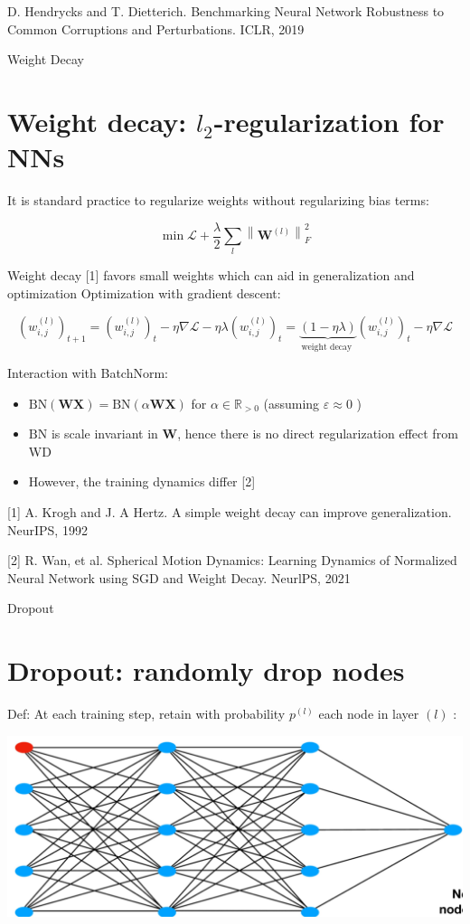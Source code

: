 \documentclass[10pt]{article}
\begin{document}
D. Hendrycks and T. Dietterich. Benchmarking Neural Network Robustness to Common Corruptions and Perturbations. ICLR, 2019

Weight Decay

\section*{Weight decay: $l_{2}$-regularization for NNs}
It is standard practice to regularize weights without regularizing bias terms:

$$
\min \mathscr{L}+\frac{\lambda}{2} \sum_{l}\left\|\mathbf{W}^{(l)}\right\|_{F}^{2}
$$

Weight decay [1] favors small weights which can aid in generalization and optimization Optimization with gradient descent:

$$
\left(w_{i, j}^{(l)}\right)_{t+1}=\left(w_{i, j}^{(l)}\right)_{t}-\eta \nabla \mathscr{L}-\eta \lambda\left(w_{i, j}^{(l)}\right)_{t}=\underbrace{(1-\eta \lambda)}_{\text {weight decay }}\left(w_{i, j}^{(l)}\right)_{t}-\eta \nabla \mathscr{L}
$$

Interaction with BatchNorm:

\begin{itemize}
  \item $\mathrm{BN}(\mathbf{W X})=\mathrm{BN}(\alpha \mathbf{W X})$ for $\alpha \in \mathbb{R}_{>0}$ (assuming $\varepsilon \approx 0$ )
  \item $\mathrm{BN}$ is scale invariant in $\mathbf{W}$, hence there is no direct regularization effect from WD
  \item However, the training dynamics differ [2]
\end{itemize}

[1] A. Krogh and J. A Hertz. A simple weight decay can improve generalization. NeurIPS, 1992

[2] R. Wan, et al. Spherical Motion Dynamics: Learning Dynamics of Normalized Neural Network using SGD and Weight Decay. NeurlPS, 2021

Dropout

\section*{Dropout: randomly drop nodes}
Def: At each training step, retain with probability $p^{(l)}$ each node in layer $(l)$ :

\begin{center}
\includegraphics[max width=\textwidth]{2024_01_08_959e2db67a31f073f6d2g-29}
\end{center}
\end{document}
